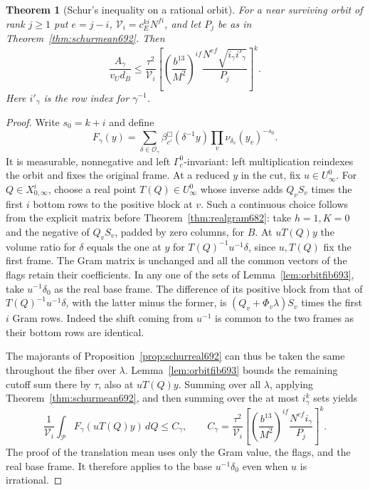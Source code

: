 \documentclass[a4paper,11pt]{article}
\newtheorem{theorem}[proposition]{Theorem}
\theoremstyle{definition}
\theoremstyle{remark}
\numberwithin{equation}{section}
\begin{document}
\begin{theorem}[Schur's inequality on a rational orbit]\leavevmode
\label{thm:orbitschur693}
For a near surviving orbit of rank \(j\ge1\) put \(e=j-i\),
\(\mathcal V_i=c_E^{ki}N^{fi}\), and let \(P_j\) be as in
Theorem~\ref{thm:schurmean692}. Then
\[
 \frac{A_\gamma}{v_U d_B}
 \le \frac{\tau^2}{\mathcal V_i}
       \left[
       \left(\frac{b^{13}}{M^2}\right)^{if}
                  \frac{N^{ef}\sqrt{i_\gamma i'_\gamma}}{P_j}
       \right]^k .
\]
Here \(i'_\gamma\) is the row index for \(\gamma^{-1}\).
\end{theorem}
\begin{proof}
Write \(s_0=k+i\) and define
\[
 F_\gamma(y)=\sum_{\delta\in\mathcal O_\gamma}
          \beta_{c'}^\Box(\delta^{-1}y)
                       \prod_v\nu_{\delta_v}(y_v)^{-s_0}.
\]
It is measurable, nonnegative and left \(\Gamma_c^0\)-invariant:
left multiplication reindexes the orbit and fixes the original
frame. At a reduced \(y\) in the cut, fix \(u\in U_\infty^0\).
For \(Q\in X_{0,\infty}^i\), choose a real point \(T(Q)\in
U_\infty^0\) whose inverse adds \(Q_v S_v\) times the first
\(i\) bottom rows to the positive block at \(v\). Such a
continuous choice follows from the explicit matrix before
Theorem~\ref{thm:realgram682}: take \(h=1,K=0\) and the
negative of \(Q_v S_v\), padded by zero columns, for \(B\).
At \(uT(Q)y\) the volume ratio for \(\delta\) equals the one
at \(y\) for \(T(Q)^{-1}u^{-1}\delta\), since \(u,T(Q)\)
fix the first frame. The Gram matrix is unchanged and all
the common vectors of the flags retain their coefficients.
In any one of the sets of Lemma~\ref{lem:orbitfib693}, take
\(u^{-1}\delta_0\) as the real base frame. The difference of
its positive block from that of \(T(Q)^{-1}u^{-1}\delta\),
with the latter minus the former, is
\((Q_v+\Phi_v\lambda)S_v\) times the first \(i\) Gram rows.
Indeed the shift coming from \(u^{-1}\) is common to the two
frames as their bottom rows are identical.

The majorants of Proposition~\ref{prop:schurreal692} can thus
be taken the same throughout the fiber over \(\lambda\).
Lemma~\ref{lem:orbitfib693} bounds the remaining cutoff sum
there by \(\tau\), also at \(uT(Q)y\). Summing over all
\(\lambda\), applying Theorem~\ref{thm:schurmean692}, and
then summing over the at most \(i_\gamma^k\) sets yields
\[
 \frac1{\mathcal V_i}\int_{\mathcal P} F_\gamma(uT(Q)y)\,dQ
 \le C_\gamma,\qquad
 C_\gamma=\frac{\tau^2}{\mathcal V_i}
       \left[\left(\frac{b^{13}}{M^2}\right)^{if}
                        \frac{N^{ef}i_\gamma}{P_j}\right]^k .
\]
The proof of the translation mean uses only the Gram value,
the flags, and the real base frame. It therefore applies to the
base \(u^{-1}\delta_0\) even when \(u\) is irrational.


\end{proof}
\end{document}
